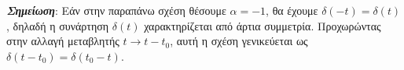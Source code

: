\documentclass[a4paper,twoside,10pt,openany]{memoir}
\theoremstyle{dotless}
\begin{document}
\noindent \emph {\textbf {Σημείωση}}: Εάν στην παραπάνω σχέση θέσουμε $\alpha=-1$, θα έχουμε $\delta(-t)=\delta(t)$, δηλαδή η συνάρτηση $\delta(t)$ χαρακτηρίζεται από άρτια συμμετρία. Προχωρώντας στην αλλαγή μεταβλητής $t\rightarrow t-t_0$, αυτή η σχέση γενικεύεται ως $\delta(t-t_0)=\delta(t_0-t)$.\vspace{0.3cm}
\end{document}
